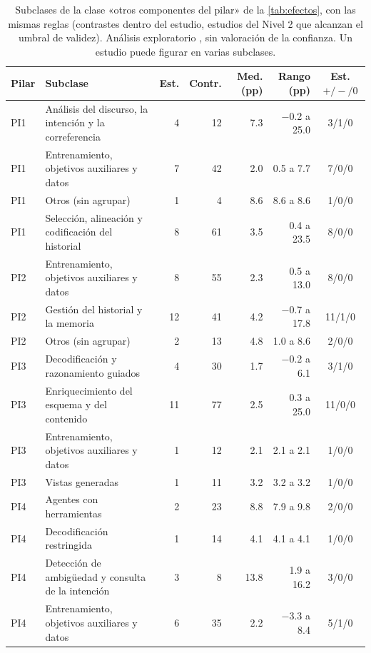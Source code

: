 \begin{table}[!htbp]
\centering
\caption{Subclases de la clase «otros componentes del pilar» de la \cref{tab:efectos}, con las mismas reglas (contrastes dentro del estudio, estudios del Nivel 2 que alcanzan el umbral de validez). Análisis exploratorio , sin valoración de la confianza. Un estudio puede figurar en varias subclases.}
\label{tab:otros}
\footnotesize
\begin{tabularx}{\linewidth}{@{}l X r r r r c@{}}
\toprule
Pilar & Subclase & Est. & Contr. & Med. (pp) & Rango (pp) & Est. $+/-/0$ \\
\midrule
PI1 & Análisis del discurso, la intención y la correferencia & 4 & 12 & \num{7.3} & \num{-0.2} a \num{25.0} & 3/1/0 \\
PI1 & Entrenamiento, objetivos auxiliares y datos & 7 & 42 & \num{2.0} & \num{0.5} a \num{7.7} & 7/0/0 \\
PI1 & Otros (sin agrupar) & 1 & 4 & \num{8.6} & \num{8.6} a \num{8.6} & 1/0/0 \\
PI1 & Selección, alineación y codificación del historial & 8 & 61 & \num{3.5} & \num{0.4} a \num{23.5} & 8/0/0 \\
\addlinespace
PI2 & Entrenamiento, objetivos auxiliares y datos & 8 & 55 & \num{2.3} & \num{0.5} a \num{13.0} & 8/0/0 \\
PI2 & Gestión del historial y la memoria & 12 & 41 & \num{4.2} & \num{-0.7} a \num{17.8} & 11/1/0 \\
PI2 & Otros (sin agrupar) & 2 & 13 & \num{4.8} & \num{1.0} a \num{8.6} & 2/0/0 \\
\addlinespace
PI3 & Decodificación y razonamiento guiados & 4 & 30 & \num{1.7} & \num{-0.2} a \num{6.1} & 3/1/0 \\
PI3 & Enriquecimiento del esquema y del contenido & 11 & 77 & \num{2.5} & \num{0.3} a \num{25.0} & 11/0/0 \\
PI3 & Entrenamiento, objetivos auxiliares y datos & 1 & 12 & \num{2.1} & \num{2.1} a \num{2.1} & 1/0/0 \\
PI3 & Vistas generadas & 1 & 11 & \num{3.2} & \num{3.2} a \num{3.2} & 1/0/0 \\
\addlinespace
PI4 & Agentes con herramientas & 2 & 23 & \num{8.8} & \num{7.9} a \num{9.8} & 2/0/0 \\
PI4 & Decodificación restringida & 1 & 14 & \num{4.1} & \num{4.1} a \num{4.1} & 1/0/0 \\
PI4 & Detección de ambigüedad y consulta de la intención & 3 & 8 & \num{13.8} & \num{1.9} a \num{16.2} & 3/0/0 \\
PI4 & Entrenamiento, objetivos auxiliares y datos & 6 & 35 & \num{2.2} & \num{-3.3} a \num{8.4} & 5/1/0 \\
\bottomrule
\end{tabularx}
\end{table}
